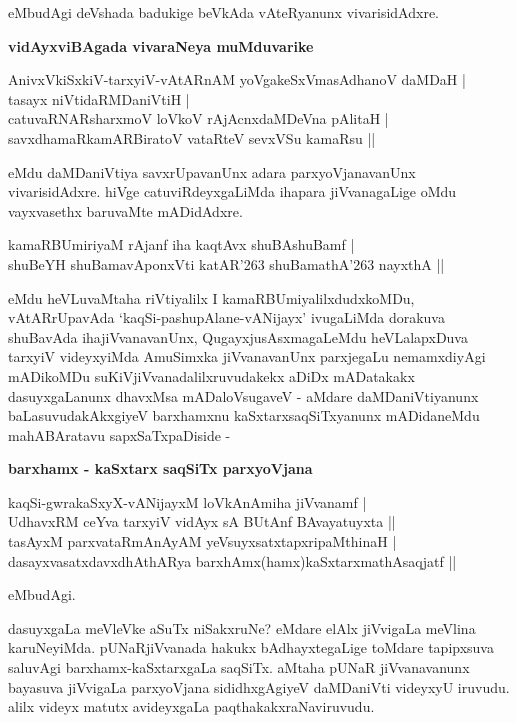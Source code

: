 \noindent
eMbudAgi deVshada badukige beVkAda vAteRyanunx vivarisidAdxre.

{\bigskip
\noindent
{\large\bf vidAyxviBAgada vivaraNeya muMduvarike}}\label{page90}
\medskip

\begin{shloka}
AnivxVkiSxkiV-tarxyiV-vAtARnAM yoVgakeSxVmasAdhanoV daMDaH |\\\label{90}
tasayx niVtidaRMDaniVtiH |\\
catuvaRNARsharxmoV loVkoV rAjAcnxdaMDeVna pAlitaH |\\\label{90}
savxdhamaRkamARBiratoV vataRteV sevxVSu kamaRsu ||
\end{shloka}

\noindent
eMdu daMDaniVtiya savxrUpavanUnx adara parxyoVjanavanUnx vivarisidAdxre. hiVge catuviRdeyx\-gaLiMda ihapara jiVvanagaLige oMdu vayxvasethx baruvaMte mADidAdxre.

\begin{shloka}
kamaRBUmiriyaM rAjanf iha kaqtAvx shuBAshuBamf |\\\label{90}
shuBeYH shuBamavAponxVti katAR\char'263 shuBamathA\char'263 nayxthA ||
\end{shloka}

\noindent
eMdu heVLuvaMtaha riVtiyalilx I kamaRBUmiyalilxdudxkoMDu, vAtAR\-rUpavAda `kaqSi-pashu\-pAlane-vANijayx' ivugaLiMda dorakuva shuBavAda ihajiVvanavanUnx, QugayxjusAsxmagaLeMdu heVLalapx\-Duva tarxyiV videyxyiMda AmuSimxka jiVvanavanUnx parxjegaLu nemamxdiyAgi mADikoMDu suKiVjiVvana\-dalilxru\-vudakekx aDiDx mADatakakx dasuyxgaLanunx dhavxMsa mADaloVsugaveV - aMdare daMDaniVtiyanunx baLasu\-vuda\-kAkxgiyeV barxhamxnu kaSxtarxsaqSiTxyanunx mADidaneMdu mahABAratavu sapxSaTxpaDiside - 

{\bigskip
\noindent
{\large\bf barxhamx - kaSxtarx saqSiTx parxyoVjana}}\label{page91}
\medskip

\begin{shloka}
kaqSi-gwrakaSxyX-vANijayxM loVkAnAmiha jiVvanamf |\\\label{91}
UdhavxRM ceYva tarxyiV vidAyx sA BUtAnf BAvayatuyxta ||\\
tasAyxM parxvataRmAnAyAM yeVsuyxsatxtapxripaMthinaH |\\
dasayxvasatxdavxdhAthARya barxhAmx(hamx)kaSxtarxmathAsaqjatf ||
\end{shloka}

\noindent
eMbudAgi.

dasuyxgaLa meVleVke aSuTx niSakxruNe? eMdare elAlx jiVvigaLa meVlina karuNeyiMda. pUNaRjiVvanada hakukx bAdhayxtegaLige toMdare tapipxsuva saluvAgi barxhamx-kaSxtarxgaLa saqSiTx. aMtaha pUNaR jiVvanavanunx baya\-suva jiVvigaLa parxyoVjana sididhxgAgiyeV daMDaniVti videyxyU iruvudu. alilx videyx matutx avideyxgaLa paqthakakxraNaviruvudu.


